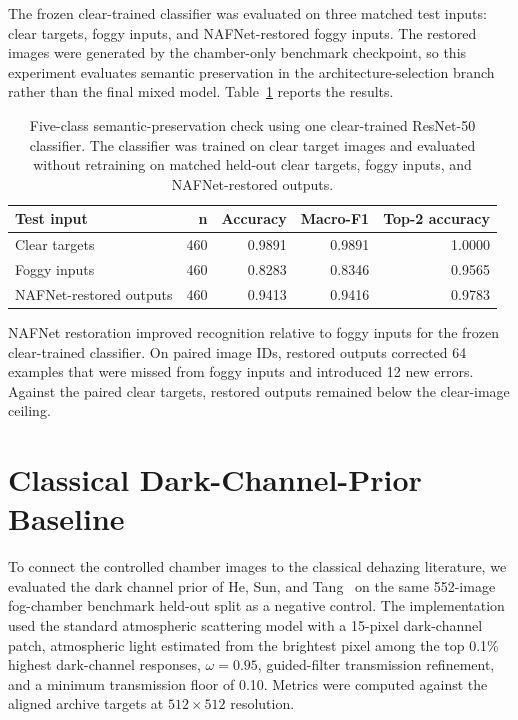 \documentclass[9pt]{osa-supplemental-document}
\begin{document}
The frozen clear-trained classifier was evaluated on three matched
test inputs: clear targets, foggy inputs, and NAFNet-restored foggy
inputs. The restored images were generated by the chamber-only
benchmark checkpoint, so this experiment evaluates semantic
preservation in the architecture-selection branch rather than the
final mixed model. Table~\ref{tabS:classification_semantic} reports
the results.

\begin{table}[htbp]
\centering
\scriptsize
\caption{Five-class semantic-preservation check using one clear-trained ResNet-50 classifier. The classifier was trained on clear target images and evaluated without retraining on matched held-out clear targets, foggy inputs, and NAFNet-restored outputs.}
\label{tabS:classification_semantic}
\begin{tabular}{lrrrr}
\toprule
\textbf{Test input} & \textbf{n} & \textbf{Accuracy} & \textbf{Macro-F1} & \textbf{Top-2 accuracy} \\
\midrule
Clear targets & 460 & 0.9891 & 0.9891 & 1.0000 \\
Foggy inputs & 460 & 0.8283 & 0.8346 & 0.9565 \\
NAFNet-restored outputs & 460 & 0.9413 & 0.9416 & 0.9783 \\
\bottomrule
\end{tabular}
\end{table}

NAFNet restoration improved recognition relative to foggy inputs for the frozen clear-trained classifier. On paired image IDs, restored outputs corrected 64 examples that were missed from foggy inputs and introduced 12 new errors. Against the paired clear targets, restored outputs remained below the clear-image ceiling.
\FloatBarrier

\section{Classical Dark-Channel-Prior Baseline}

To connect the controlled chamber images to the classical dehazing literature, we evaluated the dark channel prior of He, Sun, and Tang~\cite{he2010single} on the same 552-image fog-chamber benchmark held-out split as a negative control. The implementation used the standard atmospheric scattering model with a 15-pixel dark-channel patch, atmospheric light estimated from the brightest pixel among the top 0.1\% highest dark-channel responses, $\omega=0.95$, guided-filter transmission refinement, and a minimum transmission floor of 0.10. Metrics were computed against the aligned archive targets at $512 \times 512$ resolution.
\end{document}
